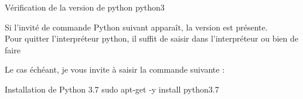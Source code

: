 \begin{Bash}{Vérification de la version de python}
python3
\end{Bash}

Si l'invité de commande Python suivant apparaît, la version est présente. \\
Pour quitter l'interpréteur python, il suffit de saisir  dans l'interpréteur ou bien de faire 

Le cas échéant, je vous invite à saisir la commande suivante :

\begin{Bash}{Installation de Python 3.7}
sudo apt-get -y install python3.7
\end{Bash}

